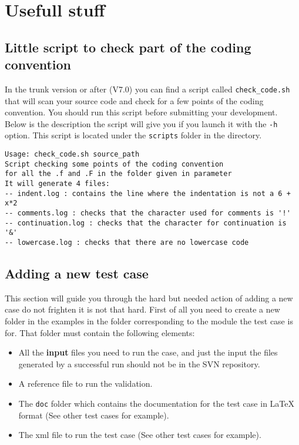 %
\chapter{Usefull stuff}
%
\section{Little script to check part of the coding convention}
%
In the trunk version or after (V7.0) you can find a script called
\verb!check_code.sh! that will scan your source code and check for a few points
of the coding convention. You should run this script before submitting your
development. Below is the description the script will give you if you launch it
with the \verb!-h! option. This script is located under the \verb!scripts!
folder in the \telemacsystem directory.
\begin{lstlisting}
Usage: check_code.sh source_path
Script checking some points of the coding convention 
for all the .f and .F in the folder given in parameter
It will generate 4 files:
-- indent.log : contains the line where the indentation is not a 6 + x*2
-- comments.log : checks that the character used for comments is '!'
-- continuation.log : checks that the character for continuation is '&'
-- lowercase.log : checks that there are no lowercase code
\end{lstlisting}

\section{Adding a new test case}
%
This section will guide you through the hard but needed action of adding a new
case do not frighten it is not that hard. First of all you need to create a new
folder in the examples in the folder corresponding to the module the test case
is for. That folder must contain the following elements:
\begin{itemize}
\item All the \textbf{input} files you need to run the case, and just the input
the files generated by a successful run should not be in the SVN repository.
\item A reference file to run the validation.
\item The \verb!doc! folder which contains the documentation for the test case
in LaTeX format (See other test cases for example).
\item The xml file to run the test case (See other test cases for example).
\end{itemize}
